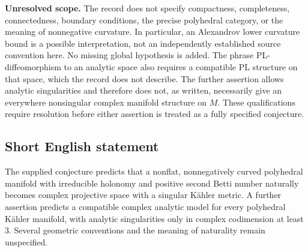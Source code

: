 \documentclass[11pt]{article}
\begin{document}
\textbf{Unresolved scope.} The record does not specify compactness, completeness, connectedness, boundary conditions, the precise polyhedral category, or the meaning of nonnegative curvature. In particular, an Alexandrov lower curvature bound is a possible interpretation, not an independently established source convention here. No missing global hypothesis is added. The phrase PL-diffeomorphism to an analytic space also requires a compatible PL structure on that space, which the record does not describe. The further assertion allows analytic singularities and therefore does not, as written, necessarily give an everywhere nonsingular complex manifold structure on \(M\). These qualifications require resolution before either assertion is treated as a fully specified conjecture.
\subsection{Short English statement}
The supplied conjecture predicts that a nonflat, nonnegatively curved polyhedral manifold with irreducible holonomy and positive second Betti number naturally becomes complex projective space with a singular K\"ahler metric. A further assertion predicts a compatible complex analytic model for every polyhedral K\"ahler manifold, with analytic singularities only in complex codimension at least \(3\). Several geometric conventions and the meaning of naturality remain unspecified.
\end{document}
